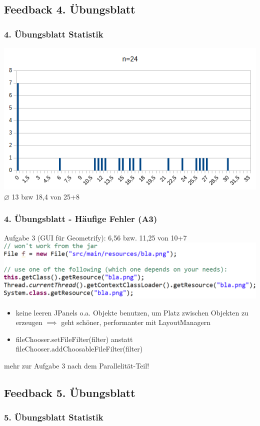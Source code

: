 \documentclass[18pt]{beamer}
\begin{document}
	\subsection{Feedback 4. Übungsblatt}
	\begin{frame}
		\frametitle{4. Übungsblatt Statistik}
		\includegraphics[scale=0.7]{./pics/tut5/statistics-ub5.png}
		\linebreak \centering $\diameter$ 13 bzw 18,4 von 25+8
	\end{frame}

	\begin{frame}
		\frametitle{4. Übungsblatt - Häufige Fehler (A3)}
		\begin{block}{Aufgabe 3 (GUI für Geometrify): 6,56 bzw. 11,25 von 10+7} 
			\includegraphics[scale=0.34]{./pics/tut5/file-resource.png}
			\begin{itemize}
				\pause
				\item keine leeren JPanels o.a. Objekte benutzen, um Platz zwischen Objekten zu erzeugen
				\linebreak $\implies$ geht schöner, performanter mit LayoutManagern \pause
				\item fileChooser.setFileFilter(filter) anstatt fileChooser.addChoosableFileFilter(filter)
			\end{itemize}
			mehr zur Aufgabe 3 nach dem Parallelität-Teil!
		\end{block}
	\end{frame}


	\subsection{Feedback 5. Übungsblatt}
	\begin{frame}
		\frametitle{5. Übungsblatt Statistik}
	\end{frame}
\end{document}
